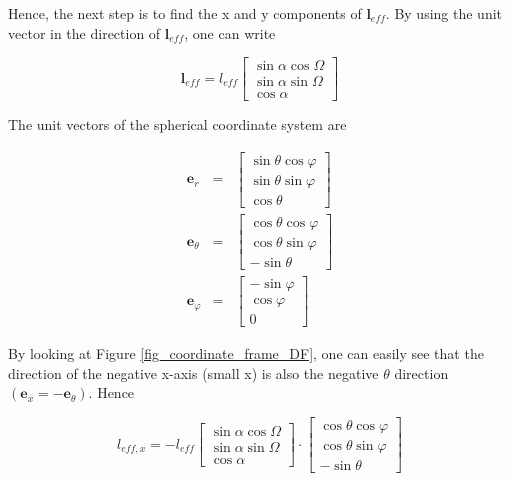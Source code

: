 \documentclass[a4paper,11pt]{report}
\begin{document}
Hence, the next step is to find the x and y components of $\textbf{l}_{eff}$. By using the unit vector in the direction of $\textbf{l}_{eff}$, one can write

\begin{equation}
\textbf{l}_{eff} = l_{eff}\left[ \begin{array}{c}
\sin \alpha \cos \Omega\\
\sin \alpha \sin \Omega\\
\cos \alpha
\end{array}  \right]
\end{equation}

The unit vectors of the spherical coordinate system are

\begin{eqnarray}
\textbf{e}_r &=& \left[ \begin{array}{c}
\sin \theta \cos \varphi\\
\sin \theta \sin \varphi\\
\cos \theta
\end{array}  \right] \\
\textbf{e}_\theta &=& \left[ \begin{array}{c}
\cos \theta \cos \varphi\\
\cos \theta \sin \varphi\\
-\sin \theta
\end{array}  \right] \\
\textbf{e}_\varphi &=& \left[ \begin{array}{c}
-\sin  \varphi\\
\cos \varphi\\
0
\end{array}  \right]
\end{eqnarray}

By looking at Figure \ref{fig_coordinate_frame_DF}, one can easily see that the direction of the negative x-axis (small x) is also the negative $\theta$ direction  $(\textbf{e}_x=-\textbf{e}_\theta)$. Hence

\begin{equation}
{l}_{eff,x} = -l_{eff} \left[ \begin{array}{c}
\sin \alpha \cos \Omega\\
\sin \alpha \sin \Omega\\
\cos \alpha
\end{array}  \right] \cdot \left[ \begin{array}{c}
\cos \theta \cos \varphi\\
\cos \theta \sin \varphi\\
-\sin \theta
\end{array}  \right]
\end{equation}
\end{document}
